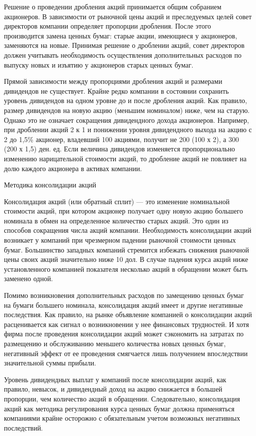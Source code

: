 Решение о проведении дробления акций принимается общим собранием акционеров. В зависимости от рыночной цены акций и преследуемых целей совет директоров компании определяет пропорции дробления. После этого производится замена ценных бумаг: старые акции, имеющиеся у акционеров, заменяются на новые. Принимая решение о дроблении акций, совет директоров должен учитывать необходимость осуществления дополнительных расходов по выпуску новых и изъятию у акционеров старых ценных бумаг.

Прямой зависимости между пропорциями дробления акций и размерами дивидендов не существует. Крайне редко компании в состоянии сохранить уровень дивидендов на одном уровне до и после дробления акций. Как правило, размер дивидендов на новую акцию (меньшим номиналом) ниже, чем на старую. Однако это не означает сокращения дивидендного дохода акционеров. Например, при дроблении акций 2 к 1 и понижении уровня дивидендного выхода на акцию с 2 до 1,5\% акционер, владевший 100 акциями, получит не 200 (100 х 2), а 300 (200  х 1,5) ден. ед. Если величина дивидендов изменяется пропорционально изменению нарицательной стоимости акций, то дробление акций не повлияет на долю каждого акционера в активах компании.

Методика консолидации акций

Консолидация акций (или обратный сплит) --- это изменение номинальной стоимости акций, при котором акционер получает одну новую акцию большего номинала в обмен на определенное количество старых акций. Это один из способов сокращения числа акций компании. Необходимость консолидации акций возникает у компаний при чрезмерном падении рыночной стоимости ценных бумаг. Большинство западных компаний стремится избежать снижения рыночной цены своих акций значительно ниже 10 дол. В случае падения курса акций ниже установленного компанией показателя несколько акций в обращении может быть заменено одной.

Помимо возникновения дополнительных расходов по замещению ценных бумаг на бумаги большего номинала, консолидация акций имеет и другие негативные последствия. Как правило, на рынке объявление компанией о консолидации акций расценивается как сигнал о возникновении у нее финансовых трудностей. И хотя фирма после проведения консолидации акций может сэкономить на затратах по размещению и обслуживанию меньшего количества новых ценных бумаг, негативный эффект от ее проведения смягчается лишь получением впоследствии значительной суммы прибыли.

Уровень дивидендных выплат у компаний после консолидации акций, как правило, невысок, и дивидендный доход на акцию снижается в большей пропорции, чем количество акций в обращении. Следовательно, консолидация акций как методика регулирования курса ценных бумаг должна применяться компаниями крайне осторожно с обязательным учетом возможных негативных последствий.








